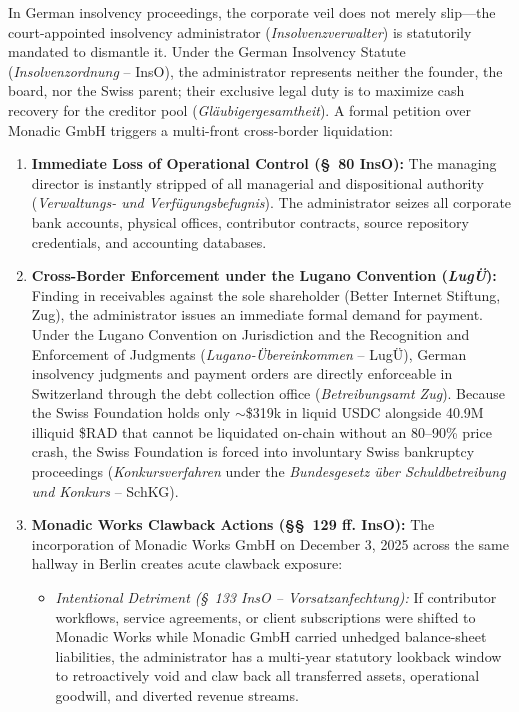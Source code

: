 \documentclass[a4paper,11pt,twoside,parskip=half-,headings=small]{scrartcl}
\begin{document}
In German insolvency proceedings, the corporate veil does not merely slip---the court-appointed insolvency administrator (\emph{Insolvenzverwalter}) is statutorily mandated to dismantle it. Under the German Insolvency Statute (\emph{Insolvenzordnung} -- InsO), the administrator represents neither the founder, the board, nor the Swiss parent; their exclusive legal duty is to maximize cash recovery for the creditor pool (\emph{Gl{\"a}ubigergesamtheit}). A formal petition over Monadic GmbH triggers a multi-front cross-border liquidation:
\begin{enumerate}[nosep]
  \item \textbf{Immediate Loss of Operational Control (\S~80 InsO):} The managing director is instantly stripped of all managerial and dispositional authority (\emph{Verwaltungs- und Verf{\"u}gungsbefugnis}). The administrator seizes all corporate bank accounts, physical offices, contributor contracts, source repository credentials, and accounting databases.
  \item \textbf{Cross-Border Enforcement under the Lugano Convention (\emph{Lug{\"U}}):} Finding  in receivables against the sole shareholder (Better Internet Stiftung, Zug), the administrator issues an immediate formal demand for payment. Under the Lugano Convention on Jurisdiction and the Recognition and Enforcement of Judgments (\emph{Lugano-{\"U}bereinkommen} -- Lug{\"U}), German insolvency judgments and payment orders are directly enforceable in Switzerland through the debt collection office (\emph{Betreibungsamt Zug}). Because the Swiss Foundation holds only $\sim$\$319k in liquid USDC alongside 40.9M illiquid \$RAD that cannot be liquidated on-chain without an 80--90\% price crash, the Swiss Foundation is forced into involuntary Swiss bankruptcy proceedings (\emph{Konkursverfahren} under the \emph{Bundesgesetz {\"u}ber Schuldbetreibung und Konkurs} -- SchKG).
  \item \textbf{Monadic Works Clawback Actions (\S\S~129 ff. InsO):} The incorporation of Monadic Works GmbH on December 3, 2025 across the same hallway in Berlin creates acute clawback exposure:
  \begin{itemize}[nosep]
    \item \emph{Intentional Detriment (\S~133 InsO -- Vorsatzanfechtung):} If contributor workflows, service agreements, or client subscriptions were shifted to Monadic Works while Monadic GmbH carried unhedged balance-sheet liabilities, the administrator has a multi-year statutory lookback window to retroactively void and claw back all transferred assets, operational goodwill, and diverted revenue streams.

\end{itemize}
\end{enumerate}
\end{document}
